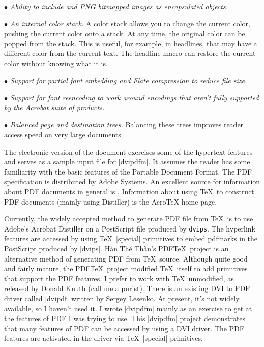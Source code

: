 \item{$\bullet$} {\it Ability to include  and
PNG bitmapped images as encapsulated objects.}

\item{$\bullet$} {\it An internal color stack.} A color stack allows you to change the current color, pushing the
current color onto a stack.  At any time, the original color
can be popped from the stack.  This is useful, for example, in
headlines, that may have a different color from the current text.
The headline macro can restore the current color without knowing
what it is.

\item{$\bullet$} {\it Support for partial font embedding and Flate compression
to reduce file size}

\item{$\bullet$} {\it Support for font reencoding to work around encodings
that aren't fully supported by the Acrobat suite of products.}

\item{$\bullet$} {\it Balanced page and destination trees.} Balancing
these trees improves reader access speed 
on very large documents.

\endlist

The electronic version of the document exercises
some of the hypertext features and serves as
a sample input file for |dvipdfm|.
It assumes the reader has some familiarity with the basic features
of the Portable Document Format.  The PDF specification
is distributed by Adobe Systems.
An excellent source for information about PDF documents
in general is .  Information about
using \TeX\ to construct PDF documents (mainly using Distiller) is the
AcroTeX home page.

Currently, the widely accepted method to generate PDF file from \TeX\
is to use Adobe's Acrobat Distiller on a PostScript
file produced by {\tt dvips}.
The hyperlink features are accessed by using \TeX\ |special| primitives
to embed pdfmarks in the PostScript produced by |dvips|.
H\`an Th\'e Th\`an's PDF\TeX\ project is an alternative method
of generating PDF from \TeX\ source.
Although quite good and fairly mature, the PDF\TeX\ project
modified \TeX\ itself to add primitives that support the PDF features.
I prefer to work with \TeX\ unmodified, as released by Donald Knuth
(call me a purist).
There is an existing DVI to PDF driver called
|dvipdf| written by Sergey Lesenko.  At present, it's not widely
available, so I haven't used it.  I wrote |dvipdfm|
mainly as an exercise to get at the features
of PDF I was trying to use.  This |dvipdfm| project demonstrates that many features
of PDF can be accessed by using a DVI driver.
The PDF features are activated in the driver via
\TeX\ |special| primitives.

